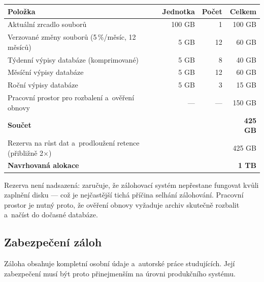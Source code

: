 \documentclass[11pt,a4paper]{article}
\begin{document}
\begin{center}
\begin{tabularx}{\textwidth}{@{}Xrrr@{}}
\toprule
\textbf{Položka} & \textbf{Jednotka} & \textbf{Počet} & \textbf{Celkem} \\
\midrule
Aktuální zrcadlo souborů & 100 GB & 1 & 100 GB \\
Verzované změny souborů (5\,\%/měsíc, 12 měsíců) & 5 GB & 12 & 60 GB \\
Týdenní výpisy databáze (komprimované) & 5 GB & 8 & 40 GB \\
Měsíční výpisy databáze & 5 GB & 12 & 60 GB \\
Roční výpisy databáze & 5 GB & 3 & 15 GB \\
Pracovní prostor pro rozbalení a~ověření obnovy & --- & --- & 150 GB \\
\midrule
\textbf{Součet} & & & \textbf{425 GB} \\
Rezerva na růst dat a~prodloužení retence (přibližně 2$\times$) & & & 425 GB \\
\midrule
\textbf{Navrhovaná alokace} & & & \textbf{1 TB} \\
\bottomrule
\end{tabularx}
\end{center}

\medskip
Rezerva není nadsazená: zaručuje, že zálohovací systém nepřestane fungovat kvůli zaplnění disku
--- což je nejčastější tichá příčina selhání zálohování. Pracovní prostor je nutný proto, že
ověření obnovy vyžaduje archiv skutečně rozbalit a~načíst do dočasné databáze.

\subsection{Zabezpečení záloh}
\label{sec:zabezpeceni}

Záloha obsahuje kompletní osobní údaje a~autorské práce studujících. Její zabezpečení musí být
proto přinejmenším na úrovni produkčního systému.
\end{document}
